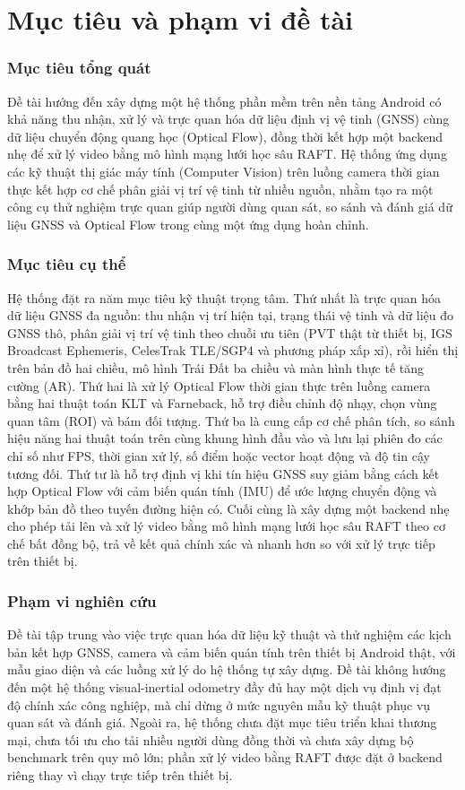 \documentclass[../DoAn.tex]{subfiles}
\begin{document}
\section{Mục tiêu và phạm vi đề tài}
\label{section:1.2}
\subsubsection{Mục tiêu tổng quát}
Đề tài hướng đến xây dựng một hệ thống phần mềm trên nền tảng Android có khả năng thu nhận, xử lý và trực quan hóa dữ liệu định vị vệ tinh (GNSS) cùng dữ liệu chuyển động quang học (Optical Flow), đồng thời kết hợp một backend nhẹ để xử lý video bằng mô hình mạng lưới học sâu RAFT. Hệ thống ứng dụng các kỹ thuật thị giác máy tính (Computer Vision) trên luồng camera thời gian thực kết hợp cơ chế phân giải vị trí vệ tinh từ nhiều nguồn, nhằm tạo ra một công cụ thử nghiệm trực quan giúp người dùng quan sát, so sánh và đánh giá dữ liệu GNSS và Optical Flow trong cùng một ứng dụng hoàn chỉnh.

\subsubsection{Mục tiêu cụ thể}
Hệ thống đặt ra năm mục tiêu kỹ thuật trọng tâm. Thứ nhất là trực quan hóa dữ liệu GNSS đa nguồn: thu nhận vị trí hiện tại, trạng thái vệ tinh và dữ liệu đo GNSS thô, phân giải vị trí vệ tinh theo chuỗi ưu tiên (PVT thật từ thiết bị, IGS Broadcast Ephemeris, CelesTrak TLE/SGP4 và phương pháp xấp xỉ), rồi hiển thị trên bản đồ hai chiều, mô hình Trái Đất ba chiều và màn hình thực tế tăng cường (AR). Thứ hai là xử lý Optical Flow thời gian thực trên luồng camera bằng hai thuật toán KLT và Farneback, hỗ trợ điều chỉnh độ nhạy, chọn vùng quan tâm (ROI) và bám đối tượng. Thứ ba là cung cấp cơ chế phân tích, so sánh hiệu năng hai thuật toán trên cùng khung hình đầu vào và lưu lại phiên đo các chỉ số như FPS, thời gian xử lý, số điểm hoặc vector hoạt động và độ tin cậy tương đối. Thứ tư là hỗ trợ định vị khi tín hiệu GNSS suy giảm bằng cách kết hợp Optical Flow với cảm biến quán tính (IMU) để ước lượng chuyển động và khớp bản đồ theo tuyến đường hiện có. Cuối cùng là xây dựng một backend nhẹ cho phép tải lên và xử lý video bằng mô hình mạng lưới học sâu RAFT theo cơ chế bất đồng bộ, trả về kết quả chính xác và nhanh hơn so với xử lý trực tiếp trên thiết bị.

\subsubsection{Phạm vi nghiên cứu}
Đề tài tập trung vào việc trực quan hóa dữ liệu kỹ thuật và thử nghiệm các kịch bản kết hợp GNSS, camera và cảm biến quán tính trên thiết bị Android thật, với mẫu giao diện và các luồng xử lý do hệ thống tự xây dựng. Đề tài không hướng đến một hệ thống visual-inertial odometry đầy đủ hay một dịch vụ định vị đạt độ chính xác công nghiệp, mà chỉ dừng ở mức nguyên mẫu kỹ thuật phục vụ quan sát và đánh giá. Ngoài ra, hệ thống chưa đặt mục tiêu triển khai thương mại, chưa tối ưu cho tải nhiều người dùng đồng thời và chưa xây dựng bộ benchmark trên quy mô lớn; phần xử lý video bằng RAFT được đặt ở backend riêng thay vì chạy trực tiếp trên thiết bị.
\end{document}
